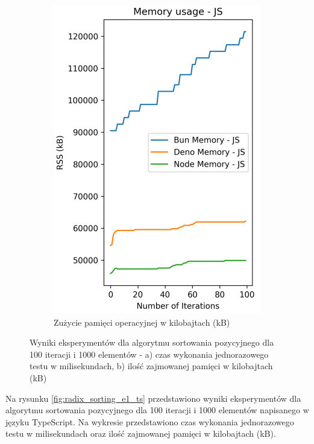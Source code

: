 \begin{figure}[H]
\begin{subfigure}[b]{0.4\textwidth}
    \includegraphics[width=\textwidth]{Figures/sorting/sorting_radix_100_1000_js_memory.png}
    \caption{Zużycie pamięci operacyjnej w kilobajtach (kB)}
    \label{fig:radix_sorting_e1_memory}
  \end{subfigure}
  \caption{Wyniki eksperymentów dla algorytmu sortowania pozycyjnego dla 100 iteracji i 1000 elementów - a) czas wykonania jednorazowego testu w milisekundach, b) ilość zajmowanej pamięci w kilobajtach (kB)}
  \label{fig:radix_sorting_e1}
\end{figure}

Na rysunku \ref{fig:radix_sorting_e1_ts} przedstawiono wyniki eksperymentów dla algorytmu sortowania pozycyjnego dla 100 iteracji i 1000 elementów napisanego w języku TypeScript. Na wykresie przedstawiono czas wykonania jednorazowego testu w milisekundach oraz ilość zajmowanej pamięci w kilobajtach (kB).

